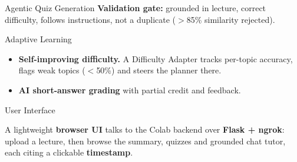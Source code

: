 \documentclass[final]{beamer}
\newlength{\colwidth}
\begin{document}
\begin{frame}[t]
\begin{columns}[t]
\begin{column}{\colwidth}
\begin{block}{Agentic Quiz Generation}
    \textbf{Validation gate:} grounded in lecture, correct difficulty, follows
    instructions, not a duplicate ($>$85\% similarity rejected).

  \end{block}

  \begin{block}{Adaptive Learning}

    \begin{itemize}
      \item \textbf{Self-improving difficulty.} A Difficulty Adapter tracks
        per-topic accuracy, flags weak topics ($<$50\%) and steers the planner there.
      \item \textbf{AI short-answer grading} with partial credit and feedback.
    \end{itemize}

  \end{block}

  \begin{block}{User Interface}

    A lightweight \textbf{browser UI} talks to the Colab backend over
    \textbf{Flask + ngrok}: upload a lecture, then browse the summary,
    quizzes and grounded chat tutor, each citing a clickable \textbf{timestamp}.


\end{block}
\end{column}
\end{columns}
\end{frame}
\end{document}
